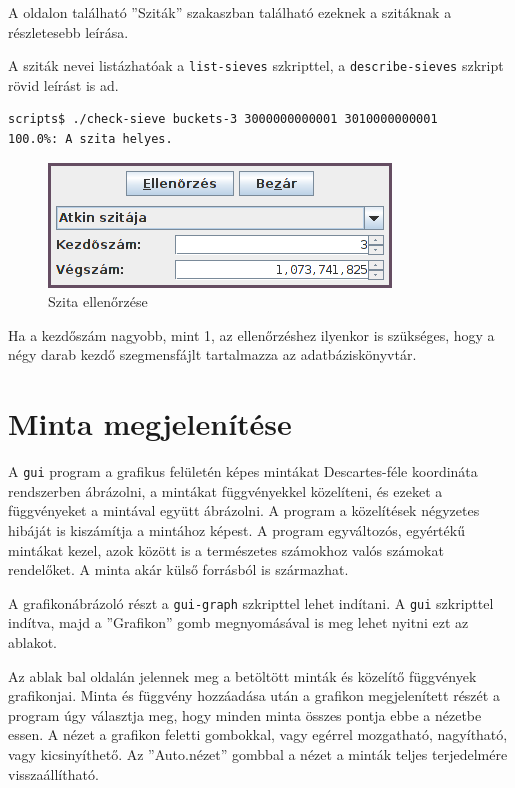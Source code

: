 A \pageref{sec:szitak} oldalon található ''Sziták'' szakaszban található ezeknek a szitáknak a részletesebb leírása.

A sziták nevei listázhatóak a \texttt{list-sieves} szkripttel, a \texttt{describe-sieves} szkript rövid leírást is ad.

\begin{lstlisting}[language=bash]
scripts$ ./check-sieve buckets-3 3000000000001 3010000000001
100.0%: A szita helyes.
\end{lstlisting}

\begin{figure}[H]
\caption{Szita ellenőrzése}
\centering
\includegraphics[scale=1]{check-sieve.png}
\end{figure}

Ha a kezdőszám nagyobb, mint 1, az ellenőrzéshez ilyenkor is szükséges, hogy a négy darab kezdő szegmensfájlt tartalmazza az adatbáziskönyvtár.

\section{Minta megjelenítése}

A \texttt{gui} program a grafikus felületén képes mintákat Descartes-féle koordináta rendszerben ábrázolni, a mintákat függvényekkel közelíteni, és ezeket a függvényeket a mintával együtt ábrázolni.
A program a közelítések négyzetes hibáját is kiszámítja a mintához képest.
A program egyváltozós, egyértékű mintákat kezel, azok között is a természetes számokhoz valós számokat rendelőket.
A minta akár külső forrásból is származhat.

A grafikonábrázoló részt a \texttt{gui-graph} szkripttel lehet indítani. A \texttt{gui} szkripttel indítva, majd a ''Grafikon'' gomb megnyomásával is meg lehet nyitni ezt az ablakot.

Az ablak bal oldalán jelennek meg a betöltött minták és közelítő függvények grafikonjai.
Minta és függvény hozzáadása után a grafikon megjelenített részét a program úgy választja meg, hogy minden minta összes pontja ebbe a nézetbe essen.
A nézet a grafikon feletti gombokkal, vagy egérrel mozgatható, nagyítható, vagy kicsinyíthető.
Az ''Auto.nézet'' gombbal a nézet a minták teljes terjedelmére visszaállítható.

